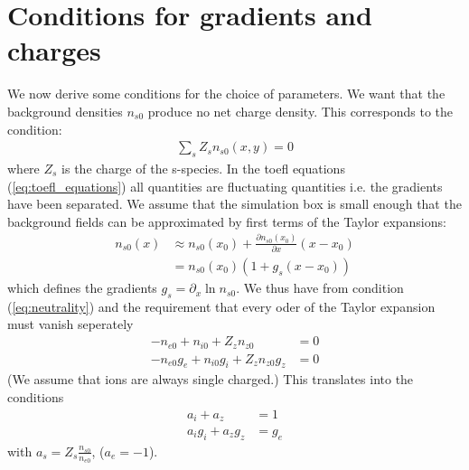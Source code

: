 \documentclass[a4paper,12pt]{scrartcl}
\begin{document}
\section{Conditions for gradients and charges}
\label{sec:conditions}
We now derive some conditions for the choice of parameters. 
We want that the background densities $n_{s0}$ produce no net charge density. This
corresponds to the condition:
\begin{align}
    \sum_s Z_s n_{s0}(x,y) = 0
\label{eq:neutrality}
\end{align}
where $Z_s$ is the charge of the s-species.
In the toefl equations (\ref{eq:toefl_equations}) all quantities are fluctuating
quantities i.e. the gradients have been separated. We assume that the 
simulation box is small enough that the background fields can be approximated by
first terms of the Taylor expansions: 
\begin{align}
    n_{s0}(x) &\approx n_{s0}(x_0) + \frac{\partial n_{s0}(x_0)}{\partial x} (x-x_0)\nonumber \\
           &= n_{s0}(x_0)( 1 + g_s(x-x_0))
\end{align}
which defines the gradients $g_s = \partial_x \ln n_{s0}$.
We thus have from condition (\ref{eq:neutrality}) and the requirement that 
every oder of the Taylor expansion must vanish seperately
\begin{subequations}
\begin{align}
    -n_{e0} + n_{i0} + Z_zn_{z0} &= 0\\
    -n_{e0}g_e + n_{i0}g_i + Z_zn_{z0}g_z &= 0
\end{align}
\end{subequations}
(We assume that ions are always single charged.) This translates into the conditions
\begin{subequations}
\begin{align}
    a_i + a_z &= 1\\
    a_ig_i + a_z g_z &= g_e
\end{align}
\label{eq:condition}
\end{subequations}
with $a_s = Z_s\frac{n_{s0}}{n_{e0}}$, ($a_e = -1$).
\end{document}
